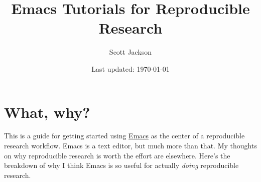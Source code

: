 \documentclass{article}
\title{Emacs Tutorials for Reproducible Research}
\author{Scott Jackson}
\date{Last updated: \today}
\begin{document}
\maketitle

\setcounter{tocdepth}{3}
\tableofcontents
\vspace*{1cm}


\newpage
\section{What, why?}
\label{sec-1}

This is a guide for getting started using \href{http://www.gnu.org/software/emacs/}{Emacs} as the center of a reproducible research workflow. Emacs is a text editor, but much more than that. My thoughts on why reproducible research is worth the effort are elsewhere. Here's the breakdown of why I think Emacs is so useful for actually \emph{doing} reproducible research.
\end{document}
